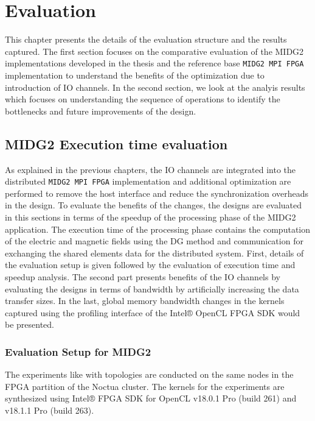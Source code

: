 \chapter{Evaluation}
\label{cha:Evaluation}

This chapter presents the details of the evaluation structure and the results
captured. The first section focuses on the comparative evaluation of
the MIDG2 implementations developed in the thesis and the reference base \texttt{MIDG2
MPI FPGA} implementation to understand the benefits of the optimization due to introduction
of IO channels. In the second section, we look at the analyis results which
focuses on understanding the sequence of operations to identify the bottlenecks
and future improvements of the design.


\section{MIDG2 Execution time evaluation}

As explained in the previous chapters, the IO channels are integrated into the
distributed \texttt{MIDG2 MPI FPGA} implementation and additional optimization are performed
to remove the host interface and reduce the synchronization overheads in the design.
To evaluate the benefits of the changes, the designs are evaluated in this sections
in terms of the speedup of the processing phase of the MIDG2 application. The execution
time of the processing phase contains the computation of the electric
and magnetic fields using the \ac{DG} method and communication for exchanging the
shared elements data for the distributed system. First, details of the
evaluation setup is given followed by the evaluation of execution
time and speedup analysis. The second part presents benefits of the IO
channels by evaluating the designs in terms of bandwidth by artificially
increasing the data transfer sizes. In the last, global memory bandwidth
changes in the kernels captured using the profiling interface of the Intel®
OpenCL FPGA SDK would be presented.

\subsection{Evaluation Setup for MIDG2}

The experiments like with topologies are conducted on the same
nodes in the FPGA partition of the Noctua cluster. The kernels
for the experiments are synthesized using Intel® FPGA SDK for OpenCL
v18.0.1 Pro (build 261) and v18.1.1 Pro (build 263).

